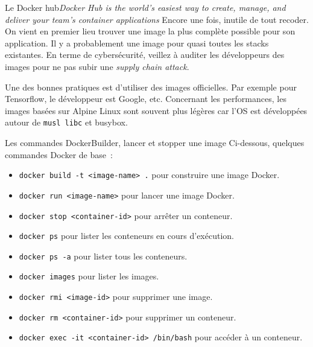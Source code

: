 \documentclass{beamer}
\begin{document}
    \begin{frame}{Le Docker hub}{\textit{Docker Hub is the world's easiest way to create, manage, and deliver your team's container applications}}
        Encore une fois, inutile de tout recoder.
        On vient en premier lieu trouver une image la plus complète possible pour son application.
        \bigbreak
        Il y a probablement une image pour quasi toutes les stacks existantes.
        \bigbreak
        En terme de cybersécurité, veillez à auditer les développeurs des images pour ne pas subir une \textit{supply chain attack}.

        Une des bonnes pratiques est d'utiliser des images officielles.
        Par exemple pour Tensorflow, le développeur est Google, etc.
        \bigbreak
        Concernant les performances, les images basées sur Alpine Linux sont souvent plus légères car l'OS est développées autour de \lstinline{musl libc} et busybox.
    \end{frame}

    \begin{frame}{Les commandes Docker}{Builder, lancer et stopper une image}
        Ci-dessous, quelques commandes Docker de base~:
        \begin{itemize}
            \item \lstinline{docker build -t <image-name> .} pour construire une image Docker.
            \item \lstinline{docker run <image-name>} pour lancer une image Docker.
            \item \lstinline{docker stop <container-id>} pour arrêter un conteneur.
            \item \lstinline{docker ps} pour lister les conteneurs en cours d'exécution.
            \item \lstinline{docker ps -a} pour lister tous les conteneurs.
            \item \lstinline{docker images} pour lister les images.
            \item \lstinline{docker rmi <image-id>} pour supprimer une image.
            \item \lstinline{docker rm <container-id>} pour supprimer un conteneur.
            \item \lstinline{docker exec -it <container-id> /bin/bash} pour accéder à un conteneur.
        \end{itemize}
    \end{frame}
\end{document}
